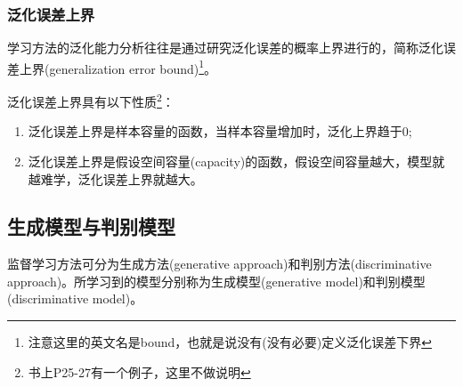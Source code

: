 \subsubsection{泛化误差上界}

学习方法的泛化能力分析往往是通过研究泛化误差的概率上界进行的，简称泛化误差上界(generalization error bound)\footnote{注意这里的英文名是bound，也就是说没有(没有必要)定义泛化误差下界}。

泛化误差上界具有以下性质\footnote{书上P25-27有一个例子，这里不做说明}：
\begin{enumerate}
    \item 泛化误差上界是样本容量的函数，当样本容量增加时，泛化上界趋于0;
    \item 泛化误差上界是假设空间容量(capacity)的函数，假设空间容量越大，模型就越难学，泛化误差上界就越大。
\end{enumerate}

\subsection{生成模型与判别模型}

监督学习方法可分为生成方法(generative approach)和判别方法(discriminative approach)。所学习到的模型分别称为生成模型(generative model)和判别模型(discriminative model)。

